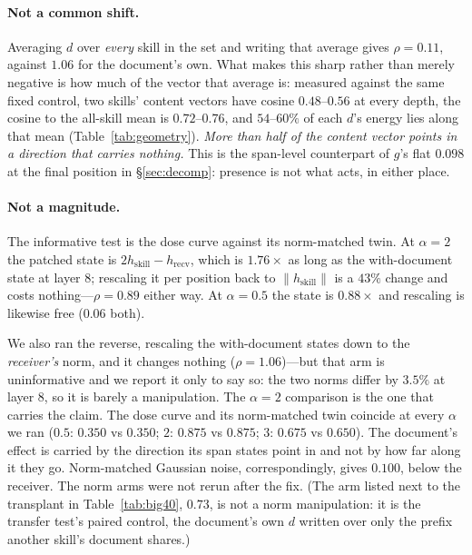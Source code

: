 \documentclass{article}
\newcommand{\dvec}{\ensuremath{d}}
\newcommand{\gvec}{\ensuremath{g}}
\begin{document}
\paragraph{Not a common shift.} Averaging $\dvec$ over \emph{every} skill in the
set and writing that average gives $\rho = 0.11$, against $1.06$ for the
document's own. What makes this sharp rather than merely negative
is how much of the vector that average is: measured against the same fixed
control, two skills' content vectors have cosine $0.48$--$0.56$ at every depth,
the cosine to the all-skill mean is $0.72$--$0.76$, and $54$--$60\%$ of each
$\dvec$'s energy lies along that mean (Table~\ref{tab:geometry}). \emph{More than
half of the content vector points in a direction that carries nothing.} This is
the span-level counterpart of $\gvec$'s flat $0.098$ at
the final position in \S\ref{sec:decomp}: presence is not what acts, in either
place.

\paragraph{Not a magnitude.} The informative test is the dose curve against its
norm-matched twin. At $\alpha = 2$ the patched state is $2h_{\text{skill}} -
h_{\text{recv}}$, which is $1.76\times$ as long as the with-document state at
layer 8; rescaling it per position back to $\|h_{\text{skill}}\|$ is a $43\%$
change and costs nothing---$\rho = 0.89$ either way. At $\alpha = 0.5$ the state
is $0.88\times$ and rescaling is likewise free ($0.06$ both).

We also ran the reverse, rescaling the with-document states down to the
\emph{receiver's} norm, and it changes nothing ($\rho = 1.06$)---but that arm is
uninformative and we report it only to say so: the two norms differ by $3.5\%$ at
layer 8, so it is barely a manipulation. The $\alpha = 2$ comparison is the one
that carries the claim. The dose curve and its norm-matched twin coincide
at every $\alpha$ we ran ($0.5$: $0.350$ vs $0.350$; $2$: $0.875$ vs $0.875$;
$3$: $0.675$ vs $0.650$). The document's effect is carried by the direction its
span states point in and not by how far along it they go. Norm-matched Gaussian
noise, correspondingly, gives $0.100$, below the receiver.
The norm arms were not rerun after the fix. (The arm listed next to the
transplant in Table~\ref{tab:big40}, $0.73$, is not a norm manipulation: it is
the transfer test's paired control, the document's own $\dvec$ written over only
the prefix another skill's document shares.)
\end{document}
